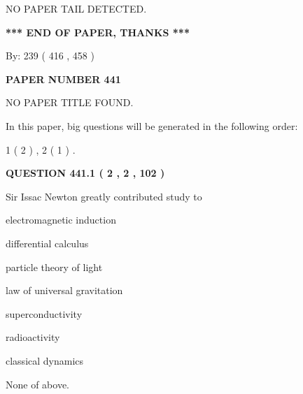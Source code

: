 \documentclass[12pt]{article}
\begin{document}
   
   
   
\vspace{2.0in} NO PAPER TAIL DETECTED.
   
   
   
   
\vspace{1.0in} 
{\textbf{\large{ *** END OF PAPER, THANKS *** }}} 
   
   
\hspace{1.0in} By: 
 239 ( 416 ,  458 )
   
   
   
   
\newpage 
\setcounter{page}{ 
   441001 } 
   
   
   
   
 {\textbf{ \Large{ PAPER NUMBER  441  }}}
   
   
\vspace{0.2in}
   
   
   
   
   
   
 NO PAPER TITLE FOUND.
   
   
   
\vspace{0.2in}
   
In this paper, big questions will be generated in the following order: 
   
   
   1 ( 2 )
 ,
   2 ( 1 )
 .
  
\vspace{0.2in}
  
{\textbf{\Large{QUESTION
441.1 
 ( 2 , 2 , 102 )
}}}
  
  
Sir Issac Newton greatly contributed study to
 
 
electromagnetic induction
 
 
differential calculus
 
 
particle theory of light
 
 
law of universal gravitation
 
 
superconductivity
 
 
radioactivity
 
 
classical dynamics
 
 
 None of above.
 
 
\noindent{}
 
\end{document}
